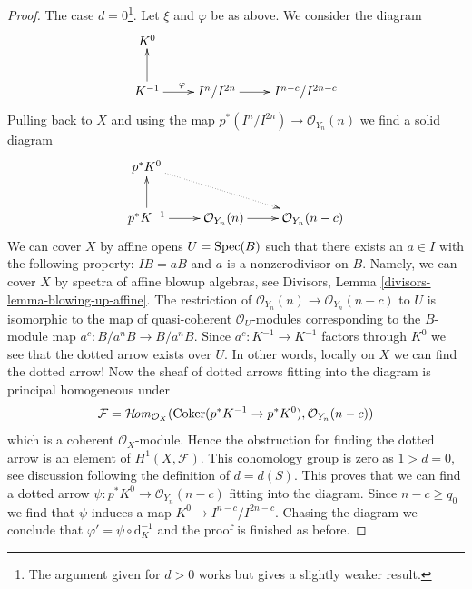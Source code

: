\begin{proof}
\medskip\noindent
The case $d = 0$\footnote{The argument given for $d > 0$ works but gives
a slightly weaker result.}. Let $\xi$ and $\varphi$ be as above.
We consider the diagram
$$
\xymatrix{
K^0 \\
K^{-1} \ar[u] \ar[r]^\varphi & I^n/I^{2n} \ar[r] & I^{n - c}/I^{2n - c}
}
$$
Pulling back to $X$ and using the map
$p^*(I^n/I^{2n}) \to \mathcal{O}_{Y_n}(n)$
we find a solid diagram
$$
\xymatrix{
p^*K^0 \ar@{..>}[rrd] \\
p^*K^{-1} \ar[u] \ar[r] &
\mathcal{O}_{Y_n}(n) \ar[r] &
\mathcal{O}_{Y_n}(n - c)
}
$$
We can cover $X$ by affine opens $U = \mathop{\mathrm{Spec}}(B)$ such that there
exists an $a \in I$ with the following property: $IB = aB$
and $a$ is a nonzerodivisor on $B$. Namely, we can cover
$X$ by spectra of affine blowup algebras, see
Divisors, Lemma \ref{divisors-lemma-blowing-up-affine}.
The restriction of $\mathcal{O}_{Y_n}(n) \to \mathcal{O}_{Y_n}(n - c)$
to $U$ is isomorphic to the map of quasi-coherent $\mathcal{O}_U$-modules
corresponding to the $B$-module map $a^c : B/a^nB \to B/a^nB$.
Since $a^c : K^{-1} \to K^{-1}$ factors through $K^0$ we see that
the dotted arrow exists over $U$. In other words,
locally on $X$ we can find the dotted arrow! Now the sheaf of dotted
arrows fitting into the diagram is principal homogeneous under
$$
\mathcal{F} = \mathop{\mathcal{H}\!\mathit{om}}\nolimits_{\mathcal{O}_X}(
\mathop{\mathrm{Coker}}(p^*K^{-1} \to p^*K^0), \mathcal{O}_{Y_n}(n - c))
$$
which is a coherent $\mathcal{O}_X$-module.
Hence the obstruction for finding the dotted arrow is an element
of $H^1(X, \mathcal{F})$. This cohomology group is zero as
$1 > d = 0$, see discussion following the definition of $d = d(S)$.
This proves that we can find a dotted arrow
$\psi : p^*K^0 \to \mathcal{O}_{Y_n}(n - c)$
fitting into the diagram. Since $n - c \geq q_0$
we find that $\psi$ induces a map $K^0 \to I^{n - c}/I^{2n - c}$.
Chasing the diagram we conclude that $\varphi' = \psi \circ \text{d}_K^{-1}$
and the proof is finished as before.
\end{proof}












